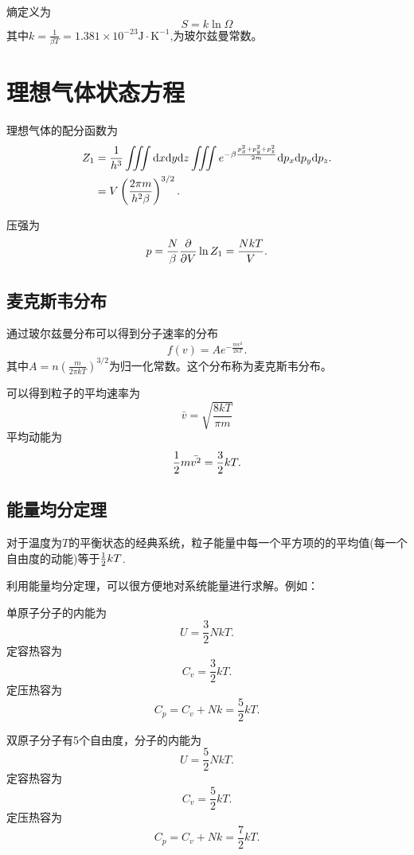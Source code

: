 熵定义为
\begin{equation}
    S=k\ln\Omega
\end{equation}
其中$k=\frac{1}{\beta T}=1.381\times 10^{-23}\mathrm{J\cdot K^{-1}}$,为玻尔兹曼常数。

\section{理想气体状态方程}
理想气体的配分函数为
\begin{equation}
    \begin{aligned}
        Z_1& =\frac{1}{h^3}\iiint\mathrm{d} x\mathrm{d} y\mathrm{d} z \iiint e^{-\beta\frac{p_x^2+p_y^2+p_z^2}{2m}}\mathrm{d} p_x \mathrm{d} p_y \mathrm{d} p_z.\\
        &=V\left(\frac{2\pi m}{h^2\beta}\right)^{3/2}.
    \end{aligned}
\end{equation}

压强为
\begin{equation}
    p=\frac{N}{\beta}\frac{\partial }{\partial V}\ln Z_1=\frac{NkT}{V}.
\end{equation}

\subsection{麦克斯韦分布}
通过玻尔兹曼分布可以得到分子速率的分布
\begin{equation}
    f(v)=A e^{-\frac{mv^2}{2kT}}.
\end{equation}
其中$A=n\left(\frac{m}{2\pi kT}\right)^{3/2}$为归一化常数。这个分布称为麦克斯韦分布。

可以得到粒子的平均速率为\[\bar{v}=\sqrt{\frac{8kT}{\pi m}}\]
平均动能为\[\frac{1}{2} m\bar{v^2}=\frac{3}{2}kT.\]

\subsection{能量均分定理}
\begin{theorem}[能量均分定理]
    对于温度为$T$的平衡状态的经典系统，粒子能量中每一个平方项的的平均值(每一个自由度的动能)等于$\frac{1}{2} kT$.
\end{theorem}

利用能量均分定理，可以很方便地对系统能量进行求解。例如：
\par 
单原子分子的内能为\[U=\frac{3}{2}NkT.\]
定容热容为\[C_v=\frac{3}{2}kT.\]
定压热容为\[C_p=C_v+Nk=\frac{5}{2}kT.\]

双原子分子有5个自由度，分子的内能为\[U=\frac{5}{2}NkT.\]
定容热容为\[C_v=\frac{5}{2}kT.\]
定压热容为\[C_p=C_v+Nk=\frac{7}{2}kT.\]

